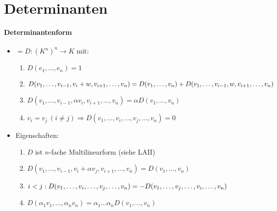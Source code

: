 \section{\label{sec:Determinanten}Determinanten}

\paragraph{Determinantenform}
\begin{itemize}
	\item $=D:{(K^n)}^n \rightarrow K$ mit:
	\begin{enumerate}
		\item $D(e_1,\dots,e_n) = 1$
		\item $D(v_1, \dots, v_{i-1}, v_i+w, v_{i+1}, \dots, v_n) \\* = D(v_1,\dots,v_n)+D(v_1, \dots, v_{i-1}, w, v_{i+1}, \dots, v_n)$
		\item $D(v_1, \dots, v_{i-1}, \alpha v_i, v_{i+1}, \dots, v_n) = \alpha D(v_1, \dots, v_n)$
		\item $v_i=v_j \ (i \neq j) \Rightarrow D(v_1, \dots, v_i, \dots, v_j, \dots, v_n) = 0$
	\end{enumerate}
	\item Eigenschaften:
	\begin{enumerate}
		\item $D$ ist $n$-fache Multilinearform (siehe LAII)
		\item $D(v_1, \dots, v_{i-1}, v_i + \alpha v_j, v_{i+1}, \dots, v_n) =D(v_1, \dots, v_n)$
		\item $i<j: D(v_1, \dots, v_i, \dots, v_j, \dots, v_n) \\* = - D(v_1, \dots, v_j, \dots, v_i, \dots, v_n)$
		\item $D(\alpha_1 v_1, \dots, \alpha_n v_n) = \alpha_1 \dots \alpha_n D(v_1, \dots, v_n)$
	\end{enumerate}
\end{itemize}

